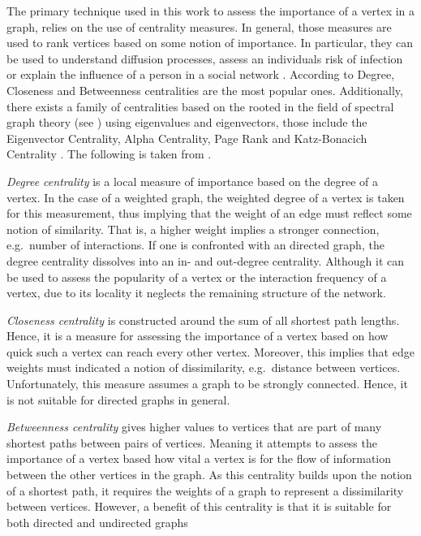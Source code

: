 \documentclass[11pt,a4paper]{book}
\theoremstyle{definition}
\theoremstyle{definition}
\theoremstyle{definition}
\theoremstyle{remark}
\begin{document}
The primary technique used in this work to assess the importance of a vertex in a graph, relies on the use of centrality measures.
In general, those measures are used to rank vertices based on some notion of importance. In particular, they can be used to understand diffusion processes, assess an individuals risk of infection or explain the influence of a 
person in a social network \parencite{bloch2019centrality}. According to \parencite{del2011centrality} Degree, Closeness and Betweenness centralities are the most popular ones. Additionally, there exists a family of centralities based on the rooted in the field of spectral graph theory (see \parencite{spielman2012spectral}) using eigenvalues and eigenvectors, those include the Eigenvector Centrality, Alpha Centrality, Page Rank and Katz-Bonacich Centrality  \parencite{bloch2019centrality}. 
The following is taken from \parencite{segarra2015stability,del2011centrality,bloch2019centrality,bonacich2001eigenvector,page1999pagerank}.

\emph{Degree centrality} is a local measure of importance based on the degree of a vertex. In the case of a weighted graph, the weighted degree of a vertex is taken for this measurement, thus implying that the weight of an edge must reflect some notion of similarity. That is, a higher weight implies a stronger connection, e.g.\ number of interactions. If one is confronted with an directed graph, the degree centrality dissolves into an in- and out-degree centrality.
Although it can be used to assess the popularity of a vertex or the interaction frequency of a vertex, due to its locality it neglects the remaining structure of the network. 
\medskip

\emph{Closeness centrality }is constructed around the sum of all shortest path lengths. Hence, it is a measure for assessing the importance of a vertex based on how quick such a vertex can reach every other vertex. 
Moreover, this implies that edge weights must indicated a notion of dissimilarity, e.g.\ distance between vertices. Unfortunately, this measure assumes a graph to be strongly connected. Hence, it is not suitable for directed graphs in general.  
\medskip

\emph{Betweenness centrality} gives higher values to vertices that are part of many shortest paths between pairs of vertices. Meaning it attempts to assess the importance of a vertex based how vital a vertex is for the flow of information between the other vertices in the graph. As this centrality builds upon the notion of a shortest path, it requires the weights of a graph to represent a dissimilarity between vertices. However, a benefit of this centrality is that it is suitable for both directed and undirected graphs
\medskip
\end{document}
